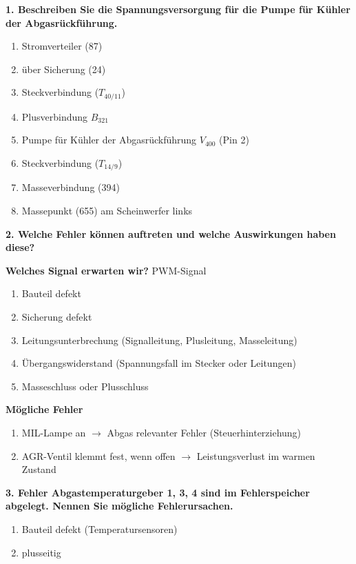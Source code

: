 \textbf{1. Beschreiben Sie die Spannungsversorgung für die Pumpe für
Kühler der Abgasrückführung.}

\begin{enumerate}
\item
  Stromverteiler (87)
\item
  über Sicherung (24)
\item
  Steckverbindung ($T_{40/11}$)
\item
  Plusverbindung $B_{321}$
\item
  Pumpe für Kühler der Abgasrückführung $V_{400}$ (Pin 2)
\item
  Steckverbindung ($T_{14/9}$)
\item
  Masseverbindung (394)
\item
  Massepunkt (655) am Scheinwerfer links
\end{enumerate}

\textbf{2. Welche Fehler können auftreten und welche Auswirkungen haben
diese?}

\textbf{Welches Signal erwarten wir?} PWM-Signal

\begin{enumerate}
\item
  Bauteil defekt
\item
  Sicherung defekt
\item
  Leitungsunterbrechung (Signalleitung, Plusleitung, Masseleitung)
\item
  Übergangswiderstand (Spannungsfall im Stecker oder Leitungen)
\item
  Masseschluss oder Plusschluss
\end{enumerate}

\textbf{Mögliche Fehler}

\begin{enumerate}
\item
  MIL-Lampe an $\to$ Abgas relevanter Fehler (Steuerhinterziehung)
\item
  AGR-Ventil klemmt fest, wenn offen $\to$ Leistungsverlust im warmen
  Zustand
\end{enumerate}

\textbf{3. Fehler Abgastemperaturgeber 1, 3, 4 sind im Fehlerspeicher
abgelegt. Nennen Sie mögliche Fehlerursachen.}

\begin{enumerate}
\item
  Bauteil defekt (Temperatursensoren)
\item
  plusseitig
\end{enumerate}

